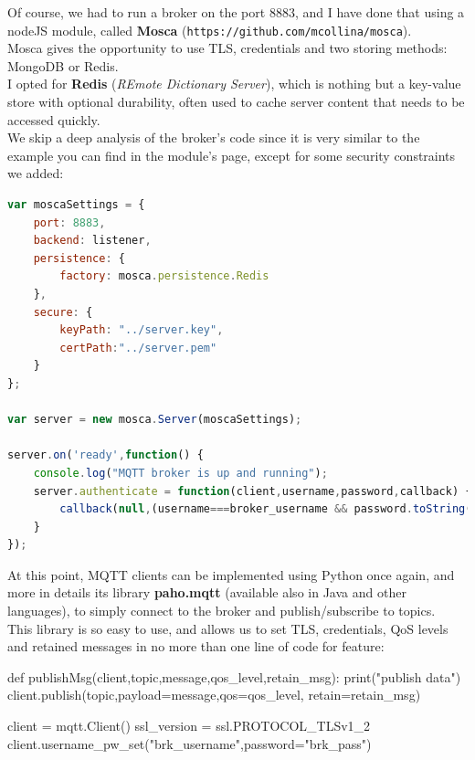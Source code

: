 \documentclass[12pt]{report}
\begin{document}
{Of course, we had to run a broker on the port 8883, and I have done that using a nodeJS module, called \textbf{Mosca} (\texttt{https://github.com/mcollina/mosca}).\\ Mosca gives the opportunity to use TLS, credentials and two storing methods: MongoDB or Redis.\\
I opted for \textbf{Redis} (\textit{REmote Dictionary Server}), which is  nothing but a key-value store with optional durability, often used to cache server content that needs to be accessed quickly.\\
We skip a deep analysis of the broker's code since it is very similar to the example you can find in the module's page, except for some security constraints we added:

\begin{center}
  \lstset{%
    caption=Mosca broker security settings,
    basicstyle=\ttfamily\small\bfseries,
    frame=tb
  }
\begin{lstlisting}[language=javascript,caption=Mosca broker security settings]
var moscaSettings = {
	port: 8883,
	backend: listener,
	persistence: {
		factory: mosca.persistence.Redis
	},
	secure: {
		keyPath: "../server.key",
		certPath:"../server.pem"
	}
};

var server = new mosca.Server(moscaSettings);

server.on('ready',function() {
	console.log("MQTT broker is up and running");
	server.authenticate = function(client,username,password,callback) {
		callback(null,(username===broker_username && password.toString('ascii')===broker_password))
	}
});
\end{lstlisting}
\end{center}


At this point, MQTT clients can be implemented using Python once again, and more in details its library \textbf{paho.mqtt} (available also in Java and other languages), to simply connect to the broker and publish/subscribe to topics.\\
This library is so easy to use, and allows us to set TLS, credentials, QoS levels and retained messages in no more than one line of code for feature:\\

\begin{python}
def publishMsg(client,topic,message,qos_level,retain_msg):
	print("publish data")
	client.publish(topic,payload=message,qos=qos_level,    					retain=retain_msg)

client = mqtt.Client()
ssl_version = ssl.PROTOCOL_TLSv1_2
client.username_pw_set("brk_username",password="brk_pass")


\end{python}}
\end{document}
